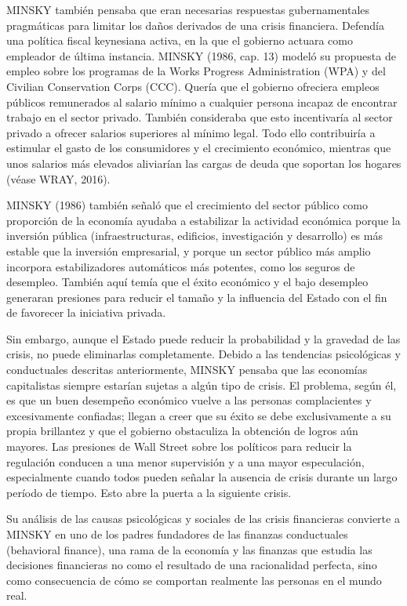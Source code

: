 \documentclass[10pt,a4paper]{article}
\begin{document}
MINSKY también pensaba que eran necesarias respuestas gubernamentales pragmáticas para limitar los daños derivados de una crisis financiera. Defendía una política fiscal keynesiana activa, en la que el gobierno actuara como empleador de última instancia. MINSKY (1986, cap. 13) modeló su propuesta de empleo sobre los programas de la Works Progress Administration (WPA) y del Civilian Conservation Corps (CCC). Quería que el gobierno ofreciera empleos públicos remunerados al salario mínimo a cualquier persona incapaz de encontrar trabajo en el sector privado. También consideraba que esto incentivaría al sector privado a ofrecer salarios superiores al mínimo legal. Todo ello contribuiría a estimular el gasto de los consumidores y el crecimiento económico, mientras que unos salarios más elevados aliviarían las cargas de deuda que soportan los hogares (véase WRAY, 2016).

MINSKY (1986) también señaló que el crecimiento del sector público como proporción de la economía ayudaba a estabilizar la actividad económica porque la inversión pública (infraestructuras, edificios, investigación y desarrollo) es más estable que la inversión empresarial, y porque un sector público más amplio incorpora estabilizadores automáticos más potentes, como los seguros de desempleo. También aquí temía que el éxito económico y el bajo desempleo generaran presiones para reducir el tamaño y la influencia del Estado con el fin de favorecer la iniciativa privada.

Sin embargo, aunque el Estado puede reducir la probabilidad y la gravedad de las crisis, no puede eliminarlas completamente. Debido a las tendencias psicológicas y conductuales descritas anteriormente, MINSKY pensaba que las economías capitalistas siempre estarían sujetas a algún tipo de crisis. El problema, según él, es que un buen desempeño económico vuelve a las personas complacientes y excesivamente confiadas; llegan a creer que su éxito se debe exclusivamente a su propia brillantez y que el gobierno obstaculiza la obtención de logros aún mayores. Las presiones de Wall Street sobre los políticos para reducir la regulación conducen a una menor supervisión y a una mayor especulación, especialmente cuando todos pueden señalar la ausencia de crisis durante un largo período de tiempo. Esto abre la puerta a la siguiente crisis.

Su análisis de las causas psicológicas y sociales de las crisis financieras convierte a MINSKY en uno de los padres fundadores de las finanzas conductuales (behavioral finance), una rama de la economía y las finanzas que estudia las decisiones financieras no como el resultado de una racionalidad perfecta, sino como consecuencia de cómo se comportan realmente las personas en el mundo real.
\end{document}
